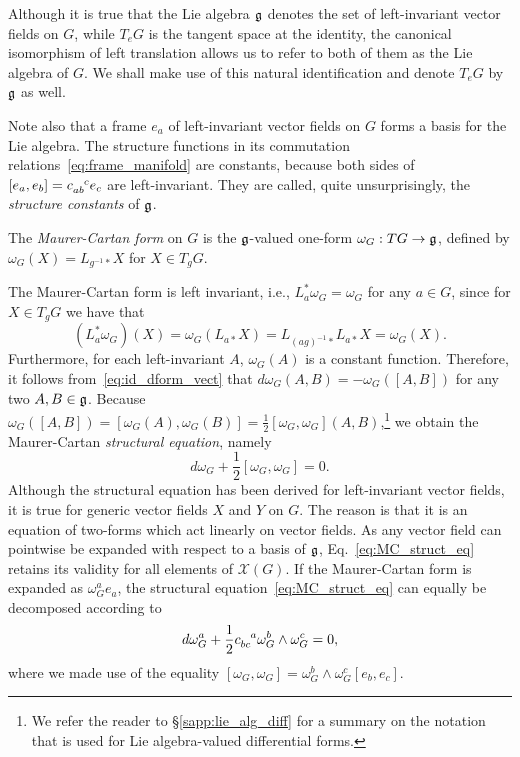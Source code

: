 \documentclass[
final,
11pt,
a4paper,
DIV=11,
headinclude=true,
footinclude=false,
bibliography=totoc,
twoside=true,  %
BCOR=5mm
]{scrbook}
\begin{document}
Although it is true that the Lie algebra $\mathfrak{g}$ denotes the set 
of left-invariant vector fields on $G$, while $T_e G$ is the 
tangent space at the identity, the canonical isomorphism of left 
translation allows us to refer to both of them as the Lie algebra 
of $G$. We shall make use of this natural identification and 
denote $T_e G$ by $\mathfrak{g}$ as well.

Note also that a frame $e_a$ of left-invariant vector fields on 
$G$ forms a basis for the Lie algebra. The structure functions in 
its commutation relations~\eqref{eq:frame_manifold} are 
constants, because both sides of $[e_a,e_b] = c\ind{_{ab}^c} e_c$ 
are left-invariant.  They are called, quite unsurprisingly, the 
\emph{structure constants} of $\mathfrak{g}$.

\begin{definition}
  The \emph{Maurer-Cartan form} on $G$ is the $\mathfrak{g}$-valued 
  one-form $\omega_G : TG \to \mathfrak{g}$, defined by $\omega_G(X) = 
  L_{g^{-1}*}X$ for $X \in T_g G$.
\end{definition}

The Maurer-Cartan form is left invariant, i.e., $L^*_a \omega_G 
= \omega_G$ for any $a \in G$, since for $X \in T_g G$ we have 
that
\begin{equation*}
  (L^\ast_a \omega_G)(X) = \omega_G(L_{a*}X) = L_{{(ag)}^{-1}*} 
  L_{a*}X = \omega_G(X).
\end{equation*}
Furthermore, for each left-invariant $A$, $\omega_G(A)$ is a 
constant function. Therefore, it follows 
from~\eqref{eq:id_dform_vect} that $d\omega_G(A,B) = 
-\omega_G([A,B])$ for any two $A,B \in \mathfrak{g}$. Because 
$\omega_G([A,B]) = [\omega_G(A),\omega_G(B)] = 
\tfrac{1}{2}[\omega_G,\omega_G](A,B)$,\footnote{We refer the 
  reader to \S\ref{sapp:lie_alg_diff} for a summary on the
  notation that is used for Lie algebra-valued differential 
  forms.} we obtain the Maurer-Cartan \emph{structural equation}, 
namely
\begin{equation}
  \label{eq:MC_struct_eq}
  d\omega_G + \frac{1}{2}[\omega_G,\omega_G] = 0.
\end{equation}
Although the structural equation has been derived for 
left-invariant vector fields, it is true for generic vector 
fields $X$ and $Y$ on $G$. The reason is that it is an equation 
of two-forms which act linearly on vector fields. As any vector 
field can pointwise be expanded with respect to a basis of 
$\mathfrak{g}$, Eq.~\eqref{eq:MC_struct_eq} retains its validity for 
all elements of $\mathscr{X}(G)$. If the Maurer-Cartan form is 
expanded as $\omega_G^a e_a$, the structural 
equation~\eqref{eq:MC_struct_eq} can equally be decomposed 
according to
\begin{equation*}
  d\omega_G^a + \frac{1}{2} c\ind{_{bc}^a} \omega_G^b \wedge 
  \omega_G^c = 0,
\end{equation*}
where we made use of the equality $[\omega_G,\omega_G] = 
\omega_G^b \wedge \omega_G^c [e_b, e_c]$.
\end{document}
